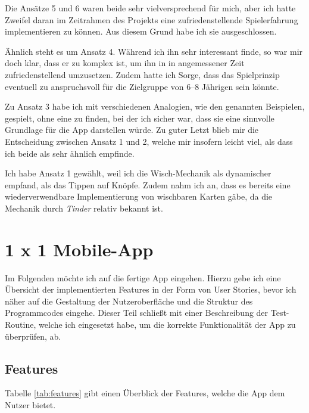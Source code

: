 Die Ansätze 5 und 6 waren beide sehr vielversprechend für mich, aber ich hatte Zweifel daran im Zeitrahmen des Projekts eine zufriedenstellende Spielerfahrung implementieren zu können.
Aus diesem Grund habe ich sie ausgeschlossen.

Ähnlich steht es um Ansatz 4. Während ich ihn sehr interessant finde, so war mir doch klar, dass er zu komplex ist, um ihn in in angemessener Zeit zufriedenstellend umzusetzen.
Zudem hatte ich Sorge, dass das Spielprinzip eventuell zu anspruchsvoll für die Zielgruppe von 6--8 Jährigen sein könnte.

Zu Ansatz 3 habe ich mit verschiedenen Analogien, wie den genannten Beispielen, gespielt, ohne eine zu finden, bei der ich sicher war, dass sie eine sinnvolle Grundlage für die App darstellen würde.
Zu guter Letzt blieb mir die Entscheidung zwischen Ansatz 1 und 2, welche mir insofern leicht viel, als dass ich beide als sehr ähnlich empfinde.

Ich habe Ansatz 1 gewählt, weil ich die Wisch-Mechanik als dynamischer empfand, als das Tippen auf Knöpfe. 
Zudem nahm ich an, dass es bereits eine wiederverwendbare Implementierung von wischbaren Karten gäbe, da die Mechanik durch \emph{Tinder} relativ bekannt ist. 

\section{1 x 1 Mobile-App}

Im Folgenden möchte ich auf die fertige App eingehen. Hierzu gebe ich eine Übersicht der implementierten Features in der Form von User Stories, bevor ich näher auf die Gestaltung der Nutzeroberfläche und die Struktur des Programmcodes eingehe.
Dieser Teil schließt mit einer Beschreibung der Test-Routine, welche ich eingesetzt habe, um die korrekte Funktionalität der App zu überprüfen, ab.

\subsection{Features}

Tabelle \ref{tab:features} gibt einen Überblick der Features, welche die App dem Nutzer bietet.

